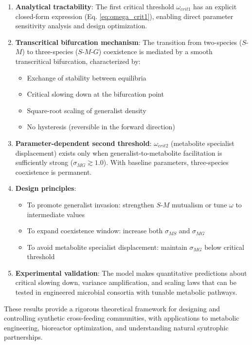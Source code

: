 \documentclass[11pt]{article}
\begin{document}
\begin{enumerate}
    \item \textbf{Analytical tractability}: The first critical threshold $\omega_{crit1}$ has an explicit closed-form expression (Eq. \ref{eq:omega_crit1}), enabling direct parameter sensitivity analysis and design optimization.

    \item \textbf{Transcritical bifurcation mechanism}: The transition from two-species ($S$-$M$) to three-species ($S$-$M$-$G$) coexistence is mediated by a smooth transcritical bifurcation, characterized by:
    \begin{itemize}
        \item Exchange of stability between equilibria
        \item Critical slowing down at the bifurcation point
        \item Square-root scaling of generalist density
        \item No hysteresis (reversible in the forward direction)
    \end{itemize}

    \item \textbf{Parameter-dependent second threshold}: $\omega_{crit2}$ (metabolite specialist displacement) exists only when generalist-to-metabolite facilitation is sufficiently strong ($\sigma_{MG} \gtrsim 1.0$). With baseline parameters, three-species coexistence is permanent.

    \item \textbf{Design principles}:
    \begin{itemize}
        \item To promote generalist invasion: strengthen $S$-$M$ mutualism or tune $\omega$ to intermediate values
        \item To expand coexistence window: increase both $\sigma_{MS}$ and $\sigma_{MG}$
        \item To avoid metabolite specialist displacement: maintain $\sigma_{MG}$ below critical threshold
    \end{itemize}

    \item \textbf{Experimental validation}: The model makes quantitative predictions about critical slowing down, variance amplification, and scaling laws that can be tested in engineered microbial consortia with tunable metabolic pathways.
\end{enumerate}

\noindent These results provide a rigorous theoretical framework for designing and controlling synthetic cross-feeding communities, with applications to metabolic engineering, bioreactor optimization, and understanding natural syntrophic partnerships.
\end{document}
